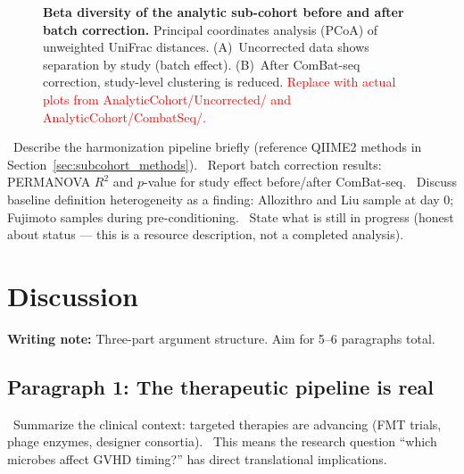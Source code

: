 \documentclass[11pt,a4paper]{article}
\newcommand{\todoitem}[1]{\textcolor{blue!70!black}{\textbullet~#1}}
\newcommand{\writingnote}[1]{\par\noindent\colorbox{yellow!30}{\parbox{\dimexpr\linewidth-2\fboxsep}{%
  \small\textbf{Writing note:} #1}}\par\medskip}
\begin{document}
\begin{figure}[htbp]
\caption{\textbf{Beta diversity of the analytic sub-cohort before and after batch correction.} Principal coordinates analysis (PCoA) of unweighted UniFrac distances. (A)~Uncorrected data shows separation by study (batch effect). (B)~After ComBat-seq correction, study-level clustering is reduced. \textcolor{red}{Replace with actual plots from AnalyticCohort/Uncorrected/ and AnalyticCohort/CombatSeq/.}}
\label{fig:beta_diversity}
\end{figure}


\todoitem{Describe the harmonization pipeline briefly (reference QIIME2 methods in Section~\ref{sec:subcohort_methods}).}
\todoitem{Report batch correction results: PERMANOVA $R^2$ and $p$-value for study effect before/after ComBat-seq.}
\todoitem{Discuss baseline definition heterogeneity as a finding: Allozithro and Liu sample at day 0; Fujimoto samples during pre-conditioning.}
\todoitem{State what is still in progress (honest about status --- this is a resource description, not a completed analysis).}


\section{Discussion}
\label{sec:discussion}

\writingnote{Three-part argument structure. Aim for 5--6 paragraphs total.}

\subsection*{Paragraph 1: The therapeutic pipeline is real}
\todoitem{Summarize the clinical context: targeted therapies are advancing (FMT trials, phage enzymes, designer consortia).}
\todoitem{This means the research question ``which microbes affect GVHD timing?'' has direct translational implications.}
\end{document}
